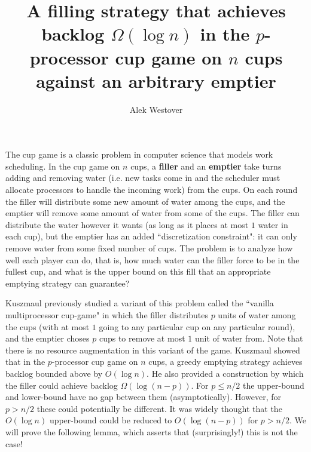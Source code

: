 \documentclass[twocolumn]{article}[11pt]
\author{Alek Westover}
\title{ A filling strategy that achieves backlog $\Omega(\log n)$ in the $p$-processor cup game on $n$ cups against an arbitrary emptier}
\begin{document}
\maketitle

The cup game is a classic problem in computer science that models work
scheduling.  In the cup game on $n$ cups, a \textbf{filler} and an
\textbf{emptier} take turns adding and removing water (i.e. new tasks come in
and the scheduler must allocate processors to handle the incoming work) from
the cups. On each round the filler will distribute some new amount of water
among the cups, and the emptier will remove some amount of water from some of
the cups. The filler can distribute the water however it wants (as long as it
places at most $1$ water in each cup), but the emptier has an added
``discretization constraint": it can only remove water from some fixed number
of cups. The problem is to analyze how well each player can do, that is, how
much water can the filler force to be in the fullest cup, and what is the upper
bound on this fill that an appropriate emptying strategy can guarantee?

Kuszmaul previously studied a variant of this problem called the ``vanilla
multiprocessor cup-game" in which the filler distributes $p$ units of water
among the cups (with at most $1$ going to any particular cup on any particular
round), and the emptier choses $p$ cups to remove at most $1$ unit of water
from. Note that there is no resource augmentation in this variant of the game.
Kuszmaul showed that in the $p$-processor cup game on $n$ cups, a greedy
emptying strategy achieves backlog bounded above by $O(\log n)$. He also
provided a construction by which the filler could achieve backlog $\Omega(\log
(n-p))$. For $p \le n/2$ the upper-bound and lower-bound have no gap between
them (asymptotically). However, for $p > n/2$ these could potentially be
different. It was widely thought that the $O(\log n)$ upper-bound could be
reduced to $O(\log(n-p))$ for $p>n/2$. We will prove the following lemma, which
asserts that (surprisingly!) this is not the case!
\end{document}
